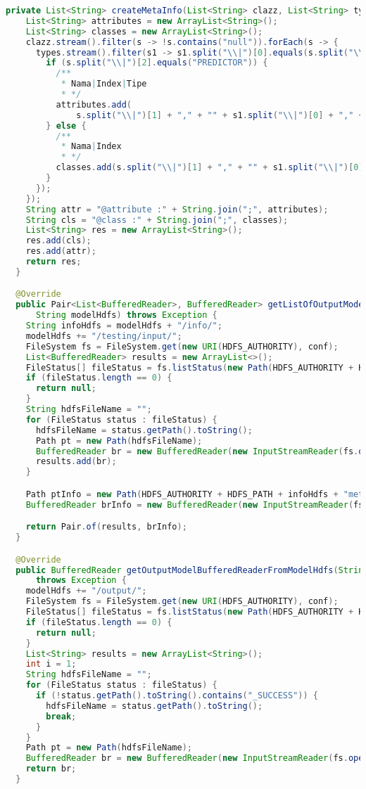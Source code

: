 \begin{lstlisting}[language=Java,basicstyle=\tiny,caption=HdfsServiceImpl.java]
  private List<String> createMetaInfo(List<String> clazz, List<String> types) {
    List<String> attributes = new ArrayList<String>();
    List<String> classes = new ArrayList<String>();
    clazz.stream().filter(s -> !s.contains("null")).forEach(s -> {
      types.stream().filter(s1 -> s1.split("\\|")[0].equals(s.split("\\|")[0])).forEach(s1 -> {
        if (s.split("\\|")[2].equals("PREDICTOR")) {
          /**
           * Nama|Index|Tipe
           * */
          attributes.add(
              s.split("\\|")[1] + "," + "" + s1.split("\\|")[0] + "," + "" + s1.split("\\|")[2]);
        } else {
          /**
           * Nama|Index
           * */
          classes.add(s.split("\\|")[1] + "," + "" + s1.split("\\|")[0]);
        }
      });
    });
    String attr = "@attribute :" + String.join(";", attributes);
    String cls = "@class :" + String.join(";", classes);
    List<String> res = new ArrayList<String>();
    res.add(cls);
    res.add(attr);
    return res;
  }

  @Override
  public Pair<List<BufferedReader>, BufferedReader> getListOfOutputModelBufferedReaderFromModelHdfs(
      String modelHdfs) throws Exception {
    String infoHdfs = modelHdfs + "/info/";
    modelHdfs += "/testing/input/";
    FileSystem fs = FileSystem.get(new URI(HDFS_AUTHORITY), conf);
    List<BufferedReader> results = new ArrayList<>();
    FileStatus[] fileStatus = fs.listStatus(new Path(HDFS_AUTHORITY + HDFS_PATH + modelHdfs));
    if (fileStatus.length == 0) {
      return null;
    }
    String hdfsFileName = "";
    for (FileStatus status : fileStatus) {
      hdfsFileName = status.getPath().toString();
      Path pt = new Path(hdfsFileName);
      BufferedReader br = new BufferedReader(new InputStreamReader(fs.open(pt)));
      results.add(br);
    }

    Path ptInfo = new Path(HDFS_AUTHORITY + HDFS_PATH + infoHdfs + "meta.info");
    BufferedReader brInfo = new BufferedReader(new InputStreamReader(fs.open(ptInfo)));

    return Pair.of(results, brInfo);
  }

  @Override
  public BufferedReader getOutputModelBufferedReaderFromModelHdfs(String modelHdfs)
      throws Exception {
    modelHdfs += "/output/";
    FileSystem fs = FileSystem.get(new URI(HDFS_AUTHORITY), conf);
    FileStatus[] fileStatus = fs.listStatus(new Path(HDFS_AUTHORITY + HDFS_PATH + modelHdfs));
    if (fileStatus.length == 0) {
      return null;
    }
    List<String> results = new ArrayList<String>();
    int i = 1;
    String hdfsFileName = "";
    for (FileStatus status : fileStatus) {
      if (!status.getPath().toString().contains("_SUCCESS")) {
        hdfsFileName = status.getPath().toString();
        break;
      }
    }
    Path pt = new Path(hdfsFileName);
    BufferedReader br = new BufferedReader(new InputStreamReader(fs.open(pt)));
    return br;
  }


\end{lstlisting}
